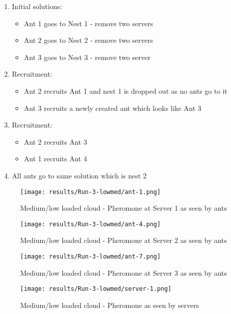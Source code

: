 \begin{enumerate}
	\item Initial solutions: 
	\begin{itemize}
		\item Ant 1 goes to Nest 1 - remove two servers
		\item Ant 2 goes to Nest 2 - remove two servers
		\item Ant 3 goes to Nest 3 - remove two server
	\end{itemize}
	\item Recruitment:
	\begin{itemize}
		\item Ant 2 recruits Ant 1 and nest 1 is dropped out as no ants go to it
		\item Ant 3 recruits a newly created ant which looks like Ant 3
	\end{itemize}
	\item Recruitment:
	\begin{itemize}
		\item Ant 2 recruits Ant 3
		\item Ant 1 recruits Ant 4
	\end{itemize}
	\item All ants go to same solution which is nest 2
\end{enumerate}

\begin{figure}[!h]
	\centering
		\texttt{[image: results/Run-3-lowmed/ant-1.png]}
	\caption{Medium/low loaded cloud - Pheromone at Server 1 as seen by ants}
	\label{fig:3serv-ant1-lowmed}
\end{figure}

\begin{figure}
	\centering
		\texttt{[image: results/Run-3-lowmed/ant-4.png]}
	\caption{Medium/low loaded cloud - Pheromone at Server 2 as seen by ants}
	\label{fig:3serv-ant4-lowmed}
\end{figure}

\begin{figure}
	\centering
		\texttt{[image: results/Run-3-lowmed/ant-7.png]}
	\caption{Medium/low loaded cloud - Pheromone at Server 3 as seen by ants}
	\label{fig:3serv-ant7-lowmed}
\end{figure}

\begin{figure}
	\centering
		\texttt{[image: results/Run-3-lowmed/server-1.png]}
	\caption{Medium/low loaded cloud - Pheromone as seen by servers}
	\label{fig:3serv-pher-lowmed}
\end{figure}

